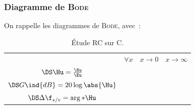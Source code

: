 \documentclass[../../main/main.tex]{subfiles}
\begin{document}
\subsubsection{Diagramme de \textsc{Bode}}
On rappelle les diagrammes de \textsc{Bode}, avec~:
\begin{table}[htbp!]
	\centering
	\caption{Étude RC sur C.}
	\begin{tabularx}{.7\linewidth}{cYYY}
		\toprule
		 &
		$\forall x$
		 &
		$x\to 0$
		 &
		$x\to\infty$
		\\
		\addlinespace[0.5em]
		\cmidrule(lr){2-4}
		$\DS\Hu = \frac{\Su}{\Eu}$
		 &
		 &
		 &
		\\
		\addlinespace[0.5em]
		$\DS G\ind{dB} = 20 \log \abs{\Hu}$
		 &
		 &
		 &
		\\
		\addlinespace[0.5em]
		$\DS\Delta\f_{s/e} = \arg*{\Hu}$
		 &
		 &
		 &
		\\
		\bottomrule
	\end{tabularx}
	\label{tab:rcc}
\end{table}
\end{document}
